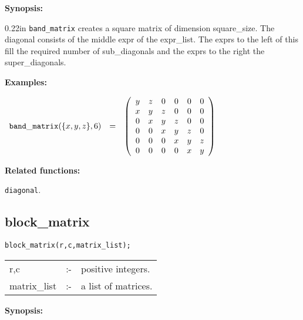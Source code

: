 {\bf Synopsis:} %

\begin{addtolength}{\leftskip}{0.22in}
                {\tt band\_matrix} creates a square matrix of dimension
                square\_size. The diagonal consists of the middle expr
                of the expr\_list. The exprs to the left of this fill
                the required number of sub\_diagonals and the exprs 
                to the right the super\_diagonals. 

\end{addtolength}

{\bf Examples:}

\begin{flushleft}  
\hspace*{0.1in}
\begin{math}  
\begin{array}{ccc}
{\tt band\_matrix}(\{x,y,z\},6) & = & 
\left( \begin{array}{cccccc} y & z & 0 & 0 & 0 & 0 \\ x & y & z & 0 & 0
& 0 \\ 0 & x & y & z & 0 & 0 \\ 0 & 0 & x & y & z & 0 \\ 0 & 0 & 0 & x &
 y & z \\ 0 & 0 & 0 & 0 & x & y 
\end{array} \right)
\end{array}  
\end{math}  
\end{flushleft}

{\bf Related functions:} 

\hspace*{0.175in} {\tt diagonal}.


\subsection{block\_matrix}


\hspace*{0.175in} {\tt block\_matrix(r,c,matrix\_list);}

\hspace*{0.1in}
\begin{tabular}{l l l}
r,c          &:-& positive integers. \\
matrix\_list &:-& a list of matrices. 
\end{tabular}

{\bf Synopsis:} %

